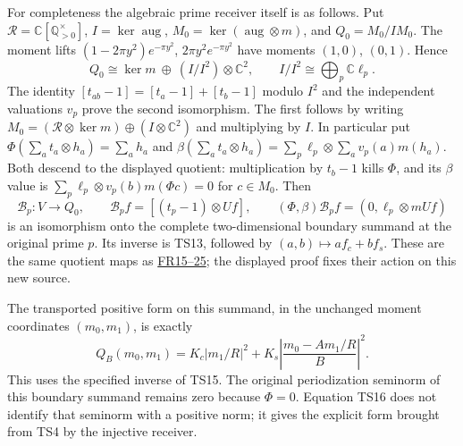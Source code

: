 For completeness the algebraic prime receiver itself is as follows.
Put \(\mathscr R=\mathbb C[\mathbb Q_{>0}^{\times}]\),
\(I=\ker\operatorname{aug}\),
\(M_0=\ker(\operatorname{aug}\otimes m)\), and \(Q_0=M_0/IM_0\).
The moment lifts
\((1-2\pi y^2)e^{-\pi y^2}\), \(2\pi y^2e^{-\pi y^2}\)
have moments \((1,0)\), \((0,1)\). Hence
\[
 Q_0\cong\ker m\ \oplus\ (I/I^2)\otimes\mathbb C^2,
 \qquad I/I^2\cong\bigoplus_p\mathbb C\ell_p.\tag{TS14}
\]
The identity \([t_{ab}-1]=[t_a-1]+[t_b-1]\) modulo \(I^2\)
and the independent valuations \(v_p\) prove the second isomorphism.
The first follows by writing
\(M_0=(\mathscr R\otimes\ker m)\oplus(I\otimes\mathbb C^2)\)
and multiplying by \(I\). In particular
put \(\Phi(\sum_a t_a\otimes h_a)=\sum_a h_a\) and
\(\beta(\sum_a t_a\otimes h_a)=
\sum_p\ell_p\otimes\sum_a v_p(a)m(h_a)\).
Both descend to the displayed quotient: multiplication by \(t_b-1\)
kills \(\Phi\), and its \(\beta\) value is
\(\sum_p\ell_p\otimes v_p(b)m(\Phi c)=0\) for \(c\in M_0\).
Then
\[
 \mathcal B_p:V\longrightarrow Q_0,\qquad
 \mathcal B_p f=[(t_p-1)\otimes Uf],\qquad
 (\Phi,\beta)\mathcal B_p f=(0,\ell_p\otimes mUf)
 \tag{TS15}
\]
is an isomorphism onto the complete two-dimensional boundary summand
at the original prime \(p\). Its inverse is TS13, followed by
\((a,b)\mapsto af_c+bf_s\). These are the same quotient maps as
\href{https://github.com/KokunoYumeto/zeta-function-research-reader/blob/ec73ac350d0cda3d95c0bd1361bede33166b4d34/workbenches/splitzero-tandem/continuations/20260923-original-zeta-return/NOTE.tex}{FR15--25};
the displayed proof fixes their action on this new source.

The transported positive form on this summand, in the unchanged
moment coordinates \((m_0,m_1)\), is exactly
\[
 Q_B(m_0,m_1)=K_c|m_1/R|^2
             +K_s\left|\frac{m_0-A m_1/R}{B}\right|^2.
 \tag{TS16}
\]
This uses the specified inverse of TS15. The original periodization
seminorm of this boundary summand remains zero because \(\Phi=0\).
Equation TS16 does not identify that seminorm with a positive norm;
it gives the explicit form brought from TS4 by the injective receiver.

